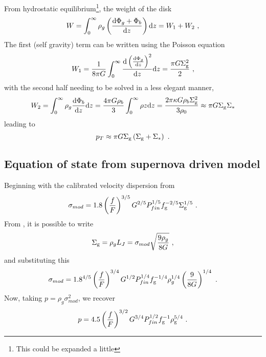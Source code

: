 From hydrostatic equilibrium\footnote{This could be expanded a little}, the weight of the disk
$$
	W = \int^\infty_0 \rho_g \left(\frac{\mathrm{d}\Phi_g + \Phi_b}{\mathrm{d}z}\right) \mathrm{d}z = W_1 + W_2~,
$$
The first (self gravity) term can be written using the Poisson equation
$$
	W_1 = \frac{1}{8\pi G}\int^\infty_0 \frac{\mathrm{d}\left(\frac{\mathrm{d}\Phi_g}{\mathrm{d}z}\right)^2}{\mathrm{d}z} \mathrm{d} z = \frac{\pi G \Sigma_\mathrm{g}^2}{2}~,
$$
with the second half needing to be solved in a less elegant manner,
$$
	W_2 = \int^\infty_0 \rho_g \frac{\mathrm{d}\Phi_b}{\mathrm{d}z}\mathrm{d}z = \frac{4\pi G \rho_b}{3} \int^\infty_0 \rho z \mathrm{d}z = \frac{2 \pi \kappa G \rho_b \Sigma_\mathrm{g}^2}{3 \rho_0} \approx \pi G \Sigma_\mathrm{g} \Sigma_*
$$
leading to
$$
	p_T \approx \pi G \Sigma_\mathrm{g}\left(\Sigma_\mathrm{g} + \Sigma_*\right)~.
$$


\subsection{Equation of state from supernova driven model}

Beginning with the calibrated velocity dispersion from \citet{martizzi_supernova_2015}
$$
	\sigma_{mod} = 1.8 \left(\frac{f}{F}\right)^{{3/5}} G^{{2/5}} P_{fin}^{{1/5}} f_\mathrm{g}^{{-2/5}} \Sigma_\mathrm{g}^{{1/5}}~.
$$
From \citet{schaye_star_2004}, it is possible to write
$$
	\Sigma_\mathrm{g} = \rho_g L_J = \sigma_{mod} \sqrt{\frac{9 \rho_g}{8G}}~,
$$
and substituting this
$$
\sigma_{mod} = 1.8^{4/5} \left(\frac{f}{F}\right)^{{3/4}} G^{{1/2}} P_{fin}^{{1/4}} f_\mathrm{g}^{{-1/4}} \rho_g^{{1/4}} \left(\frac{9}{8G}\right)^{1/4}~.
$$
Now, taking $p = \rho_g \sigma_{mod}^2$, we recover
$$
p = 4.5\left(\frac{f}{F}\right)^{{3/2}} G^{{3/4}} P_{fin}^{{1/2}} f_\mathrm{g}^{-1} \rho_\mathrm{g}^{{5/4}}~.
$$
